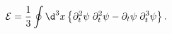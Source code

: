\begin{equation}
{\mathcal E} 
=
{1\over3} \oint \d^3 x \left\{ 
\partial_t^2 \psi \; \partial_t^2 \psi 
- \partial_t\psi \; \partial_t^3 \psi
\right\}.
\end{equation}


